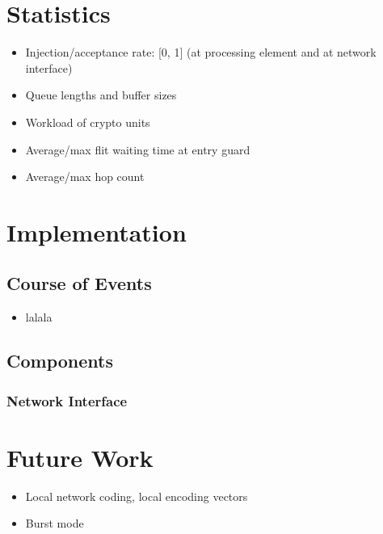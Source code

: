 \documentclass[
	paper=a4,
	fontsize=11pt,
	parskip=full %
]{scrreprt}
\begin{document}
    \chapter{Statistics}
    \begin{itemize}
        \item Injection/acceptance rate: [0, 1] (at processing element and at network interface)
        \item Queue lengths and buffer sizes
        \item Workload of crypto units
        \item Average/max flit waiting time at entry guard
        \item Average/max hop count
    \end{itemize}

    \chapter{Implementation}
    \section{Course of Events}
    \begin{itemize}
        \item lalala
    \end{itemize}

    \section{Components}
    \subsection{Network Interface}

    \chapter{Future Work}
    \begin{itemize}
        \item Local network coding, local encoding vectors
        \item Burst mode
    \end{itemize}
\end{document}
